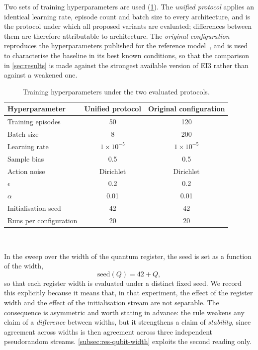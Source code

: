 \documentclass[aps,floatfix,superscriptaddress,twocolumn,tightenlines,amsmath,amssymb,nofootinbib,10pt,longbibliography,prl]{revtex4-2}
\begin{document}
Two sets of training hyperparameters are used (\ref{tab:hyperparams}). The
\emph{unified protocol} applies an identical learning rate, episode count and
batch size to every architecture, and is the protocol under which all proposed
variants are evaluated; differences between them are therefore attributable to
architecture. The \emph{original configuration} reproduces the hyperparameters
published for the reference model~\cite{costa2023}, and is used to characterise
the baseline in its best known conditions, so that the comparison in
\ref{sec:results} is made against the strongest available version of EI3 rather
than against a weakened one.

\begin{table}[htbp]
  \centering
  \caption{Training hyperparameters under the two evaluated protocols.}
  \label{tab:hyperparams}
  \begin{tabular}{lcc}
    \toprule
    Hyperparameter & Unified protocol & Original configuration \\
    \midrule
    Training episodes      & 50                & 120 \\
    Batch size             & 8                 & 200 \\
    Learning rate          & $1\times10^{-5}$  & $1\times10^{-5}$ \\
    Sample bias            & 0.5               & 0.5 \\
    Action noise           & Dirichlet         & Dirichlet \\
    \quad $\epsilon$       & 0.2               & 0.2 \\
    \quad $\alpha$         & 0.01              & 0.01 \\
    Initialisation seed    & 42                & 42 \\
    Runs per configuration & 20                & 20 \\
    \bottomrule
  \end{tabular}
  \\[3pt]
\end{table}

In the sweep over the width of the quantum register, the seed is set as a
function of the width,
%
\begin{equation}
  \mathrm{seed}(Q) = 42 + Q,
  \label{eq:seed-rule}
\end{equation}
%
so that each register width is evaluated under a distinct fixed seed. We record
this explicitly because it means that, in that experiment, the effect of the
register width and the effect of the initialisation stream are not separable.
The consequence is asymmetric and worth stating in advance: the rule weakens any
claim of a \emph{difference} between widths, but it strengthens a claim of
\emph{stability}, since agreement across widths is then agreement across three
independent pseudorandom streams. \ref{subsec:res-qubit-width} exploits the
second reading only.
\end{document}
